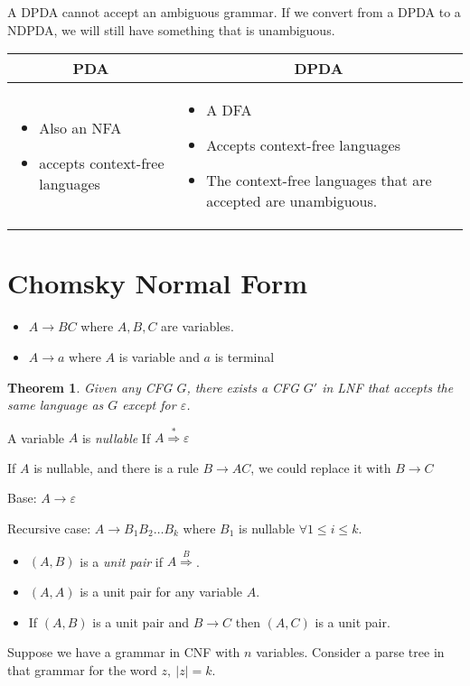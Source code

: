 \documentclass[12pt]{article}
\newtheorem{thm}{Theorem}[section]
\newcommand{\der}[1]{\ensuremath{\overset{#1}{\Rightarrow}}}
\numberwithin{equation}{subsection}
\begin{document}
A DPDA cannot accept an ambiguous grammar. If we convert from a DPDA to a NDPDA,
we will still have something that is unambiguous.

\begin{tabular}{p{}|p{}}
	\multicolumn{1}{c|}{PDA} & \multicolumn{1}{c}{DPDA} \\
	\hline
	\begin{itemize}
		\item Also an NFA
		\item accepts context-free languages
	\end{itemize}
	&
	\begin{itemize}
		\item A DFA
		\item Accepts context-free languages
		\item The context-free languages that are accepted are unambiguous.
	\end{itemize}
\end{tabular}

\section{Chomsky Normal Form}

\begin{itemize}
	\item $A \to BC$ where $A,B,C$ are variables.
	\item $A \to a$ where $A$ is variable and $a$ is terminal
\end{itemize}

\begin{thm}
	Given any CFG $G$, there exists a CFG $G'$ in LNF that accepts the same
	language as $G$ except for $\varepsilon$.
\end{thm}

A variable $A$ is \emph{nullable} If $A \der{*} \varepsilon$

If $A$ is nullable, and there is a rule $B \to AC$, we could replace it
with $B \to C$

Base: $A \to \varepsilon$

Recursive case:  $A \to B_1B_2\dots B_k$ where $B_1$ is nullable
$\forall 1\le i \le k$.

\begin{itemize}
	\item $(A,B)$ is a \emph{unit pair} if $A \der B$.
	\item $(A,A)$ is a unit pair for any variable $A$.
	\item If $(A,B)$ is a unit pair and $B \to C$ then $(A,C)$ is a unit pair.
\end{itemize}

Suppose we have a grammar in CNF with $n$ variables. Consider a parse tree in
that grammar for the word $z,\ |z|=k$.
\end{document}
